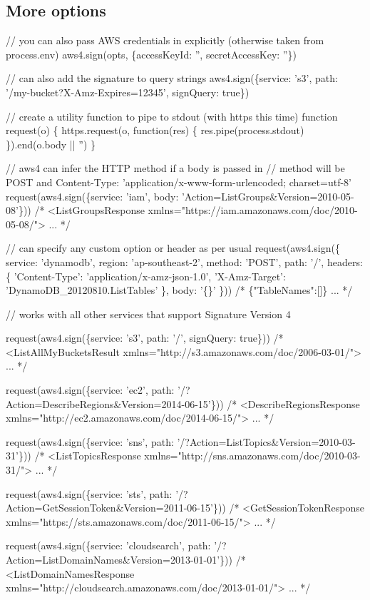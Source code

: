 \subsection*{More options }


\begin{DoxyCode}
// you can also pass AWS credentials in explicitly (otherwise taken from process.env)
aws4.sign(opts, \{accessKeyId: '', secretAccessKey: ''\})

// can also add the signature to query strings
aws4.sign(\{service: 's3', path: '/my-bucket?X-Amz-Expires=12345', signQuery: true\})

// create a utility function to pipe to stdout (with https this time)
function request(o) \{ https.request(o, function(res) \{ res.pipe(process.stdout) \}).end(o.body || '') \}

// aws4 can infer the HTTP method if a body is passed in
// method will be POST and Content-Type: 'application/x-www-form-urlencoded; charset=utf-8'
request(aws4.sign(\{service: 'iam', body: 'Action=ListGroups&Version=2010-05-08'\}))
/*
<ListGroupsResponse xmlns="https://iam.amazonaws.com/doc/2010-05-08/">
...
*/

// can specify any custom option or header as per usual
request(aws4.sign(\{
  service: 'dynamodb',
  region: 'ap-southeast-2',
  method: 'POST',
  path: '/',
  headers: \{
    'Content-Type': 'application/x-amz-json-1.0',
    'X-Amz-Target': 'DynamoDB\_20120810.ListTables'
  \},
  body: '\{\}'
\}))
/*
\{"TableNames":[]\}
...
*/

// works with all other services that support Signature Version 4

request(aws4.sign(\{service: 's3', path: '/', signQuery: true\}))
/*
<ListAllMyBucketsResult xmlns="http://s3.amazonaws.com/doc/2006-03-01/">
...
*/

request(aws4.sign(\{service: 'ec2', path: '/?Action=DescribeRegions&Version=2014-06-15'\}))
/*
<DescribeRegionsResponse xmlns="http://ec2.amazonaws.com/doc/2014-06-15/">
...
*/

request(aws4.sign(\{service: 'sns', path: '/?Action=ListTopics&Version=2010-03-31'\}))
/*
<ListTopicsResponse xmlns="http://sns.amazonaws.com/doc/2010-03-31/">
...
*/

request(aws4.sign(\{service: 'sts', path: '/?Action=GetSessionToken&Version=2011-06-15'\}))
/*
<GetSessionTokenResponse xmlns="https://sts.amazonaws.com/doc/2011-06-15/">
...
*/

request(aws4.sign(\{service: 'cloudsearch', path: '/?Action=ListDomainNames&Version=2013-01-01'\}))
/*
<ListDomainNamesResponse xmlns="http://cloudsearch.amazonaws.com/doc/2013-01-01/">
...
*/


\end{DoxyCode}
